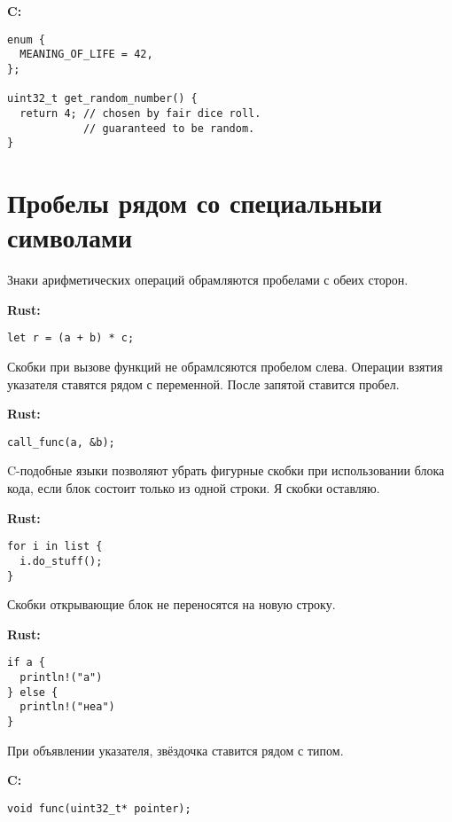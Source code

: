 \documentclass[12p]{article}
\begin{document}
\textbf{C:}
\begin{verbatim}
enum {
  MEANING_OF_LIFE = 42,
};

uint32_t get_random_number() {
  return 4; // chosen by fair dice roll.
            // guaranteed to be random.
}
\end{verbatim}

\section{Пробелы рядом со специальныи символами}

Знаки арифметических операций обрамляются пробелами с обеих сторон.\newline

\textbf{Rust:}
\begin{verbatim}
let r = (a + b) * c;
\end{verbatim}

Скобки при вызове функций не обрамлсяются пробелом слева. Операции взятия указателя ставятся рядом с переменной. После запятой ставится пробел.\newline

\textbf{Rust:}
\begin{verbatim}
call_func(a, &b);
\end{verbatim}

C-подобные языки позволяют убрать фигурные скобки при использовании блока кода, если блок состоит только из одной строки. Я скобки оставляю.\newline

\textbf{Rust:}
\begin{verbatim}
for i in list {
  i.do_stuff();
}
\end{verbatim}
\pagebreak

Скобки открывающие блок не переносятся на новую строку.\newline

\textbf{Rust:}
\begin{verbatim}
if a {
  println!("а")
} else {
  println!("неа")
}
\end{verbatim}

При объявлении указателя, звёздочка ставится рядом с типом.\newline

\textbf{C:}
\begin{verbatim}
void func(uint32_t* pointer);
\end{verbatim}
\end{document}
